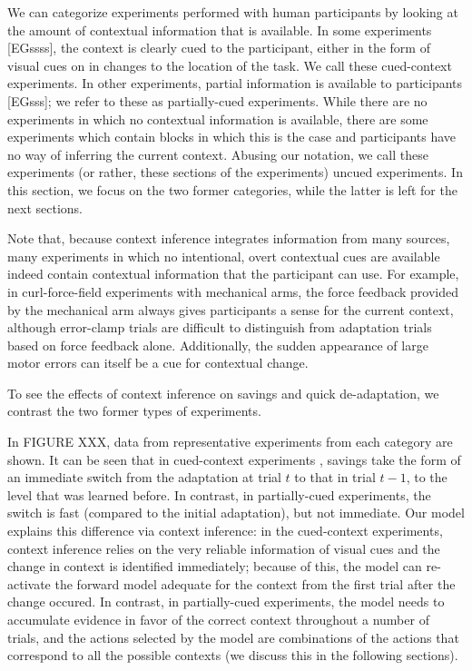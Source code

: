 \documentclass[a4paper,doc,floatsintext,natbib]{apa6}
\begin{document}
We can categorize experiments performed with human participants by looking at the amount of contextual information that is available. In some experiments [EGssss], the context is clearly cued to the participant, either in the form of visual cues on in changes to the location of the task. We call these cued-context experiments. In other experiments, partial information is available to participants [EGsss]; we refer to these as partially-cued experiments. While there are no experiments in which no contextual information is available, there are some experiments which contain blocks in which this is the case and participants have no way of inferring the current context. Abusing our notation, we call these experiments (or rather, these sections of the experiments) uncued experiments. In this section, we focus on the two former categories, while the latter is left for the next sections.

Note that, because context inference integrates information from many sources, many experiments in which no intentional, overt contextual cues are available indeed contain contextual information that the participant can use. For example, in curl-force-field experiments with mechanical arms, the force feedback provided by the mechanical arm always gives participants a sense for the current context, although error-clamp trials are difficult to distinguish from adaptation trials based on force feedback alone. Additionally, the sudden appearance of large motor errors can itself be a cue for contextual change.

To see the effects of context inference on savings and quick de-adaptation, we contrast the two former types of experiments.

In FIGURE XXX, data from representative experiments from each category are shown. It can be seen that in cued-context experiments \cite[data from][]{Oh_Minimizing_2019}, savings take the form of an immediate switch from the adaptation at trial $t$ to that in trial $t-1$, to the level that was learned before. In contrast, in partially-cued experiments, the switch is fast (compared to the initial adaptation), but not immediate. Our model explains this difference via context inference: in the cued-context experiments, context inference relies on the very reliable information of visual cues and the change in context is identified immediately; because of this, the model can re-activate the forward model adequate for the context from the first trial after the change occured. In contrast, in partially-cued experiments, the model needs to accumulate evidence in favor of the correct context throughout a number of trials, and the actions selected by the model are combinations of the actions that correspond to all the possible contexts (we discuss this in the following sections).
\end{document}
